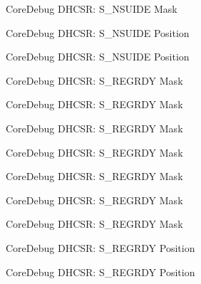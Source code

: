 \begin{DoxyRefList}
\label{deprecated__deprecated000469}%
%
Core\+Debug D\+H\+C\+SR\+: S\+\_\+\+N\+S\+U\+I\+DE Mask  
\item[Member \mbox{\hyperlink{group__CMSIS__CoreDebug_ga59e228c682eec72e892b2ce018afe477}{Core\+Debug\+\_\+\+D\+H\+C\+S\+R\+\_\+\+S\+\_\+\+N\+S\+U\+I\+D\+E\+\_\+\+Pos}} ]\label{deprecated__deprecated000017}%
%
Core\+Debug D\+H\+C\+SR\+: S\+\_\+\+N\+S\+U\+I\+DE Position 

\label{deprecated__deprecated000468}%
%
Core\+Debug D\+H\+C\+SR\+: S\+\_\+\+N\+S\+U\+I\+DE Position  
\item[Member \mbox{\hyperlink{group__CMSIS__CoreDebug_gac4cd6f3178de48f473d8903e8c847c07}{Core\+Debug\+\_\+\+D\+H\+C\+S\+R\+\_\+\+S\+\_\+\+R\+E\+G\+R\+D\+Y\+\_\+\+Msk}} ]\label{deprecated__deprecated000028}%
%
Core\+Debug D\+H\+C\+SR\+: S\+\_\+\+R\+E\+G\+R\+DY Mask 

\label{deprecated__deprecated000120}%
%
Core\+Debug D\+H\+C\+SR\+: S\+\_\+\+R\+E\+G\+R\+DY Mask 

\label{deprecated__deprecated000174}%
%
Core\+Debug D\+H\+C\+SR\+: S\+\_\+\+R\+E\+G\+R\+DY Mask 

\label{deprecated__deprecated000259}%
%
Core\+Debug D\+H\+C\+SR\+: S\+\_\+\+R\+E\+G\+R\+DY Mask 

\label{deprecated__deprecated000316}%
%
Core\+Debug D\+H\+C\+SR\+: S\+\_\+\+R\+E\+G\+R\+DY Mask 

\label{deprecated__deprecated000392}%
%
Core\+Debug D\+H\+C\+SR\+: S\+\_\+\+R\+E\+G\+R\+DY Mask 

\label{deprecated__deprecated000479}%
%
Core\+Debug D\+H\+C\+SR\+: S\+\_\+\+R\+E\+G\+R\+DY Mask  
\item[Member \mbox{\hyperlink{group__CMSIS__CoreDebug_ga20a71871ca8768019c51168c70c3f41d}{Core\+Debug\+\_\+\+D\+H\+C\+S\+R\+\_\+\+S\+\_\+\+R\+E\+G\+R\+D\+Y\+\_\+\+Pos}} ]\label{deprecated__deprecated000027}%
%
Core\+Debug D\+H\+C\+SR\+: S\+\_\+\+R\+E\+G\+R\+DY Position 

\label{deprecated__deprecated000119}%
%
Core\+Debug D\+H\+C\+SR\+: S\+\_\+\+R\+E\+G\+R\+DY Position 


\end{DoxyRefList}
